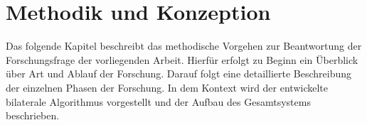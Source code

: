 
\chapter{Methodik und Konzeption}
\label{ch:methodik}
Das folgende Kapitel beschreibt das methodische Vorgehen zur Beantwortung der Forschungsfrage der vorliegenden Arbeit.
Hierfür erfolgt zu Beginn ein Überblick über Art und Ablauf der Forschung.
Darauf folgt eine detaillierte Beschreibung der einzelnen Phasen der Forschung.
In dem Kontext wird der entwickelte bilaterale Algorithmus vorgestellt und der Aufbau des Gesamtsystems beschrieben.



